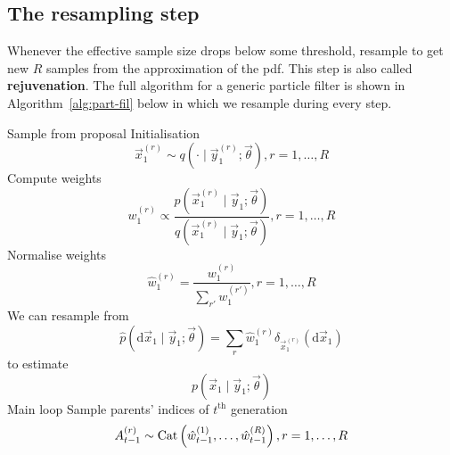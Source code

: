 \subsection{The resampling step}
    Whenever the effective sample size drops below some threshold, resample to get new $R$ samples from the approximation of the pdf. This step is also called \textbf{rejuvenation}. The full algorithm for a generic particle filter is shown in Algorithm~\ref{alg:part-fil} below in which we resample during every step.
    \begin{algorithmbis}\label{alg:part-fil}
        \begin{algorithmic}[1]
            \State Sample from proposal \Comment Initialisation
                \begin{equation}
                    \vec x_1^{(r)} \sim q\left(\cdot \mid \vec y_1^{(r)}; \vec \theta\right), r = 1, \dotsc, R
                \end{equation}
            \State Compute weights
                \begin{equation}
                    w_1^{(r)} \propto \frac{p\left(\vec x_1^{(r)} \mid \vec y_1; \vec \theta\right)}{q\left(\vec x_1^{(r)} \mid \vec y_1; \vec \theta \right)}, r = 1, \dotsc, R
                \end{equation}
            \State Normalise weights
                \begin{equation}
                    \hat w_1^{(r)} = \frac{w_1^{(r)}}{\sum_{r'} w_1^{(r')}}, r = 1, \dotsc, R
                \end{equation}
            \State We can resample from 
                \begin{equation}
                    \hat p(\mathrm d \vec x_1 \mid \vec y_1; \vec \theta) = \sum_r \hat w_1^{(r)} \delta_{\vec x_1^{(r)}}(\mathrm d\vec x_1)
                \end{equation}
                to estimate
                \begin{equation}
                    p(\vec x_1 \mid \vec y_1; \vec \theta)
                \end{equation}
             \Comment Main loop
                \State Sample parents' indices of $t^{\text{th}}$ generation
                    \begin{equation}
                        A_{t - 1}^{(r)} \sim \operatorname{Cat}\left(\hat w_{t - 1}^{(1)}, \dotsc, \hat w_{t - 1}^{(R)}\right), r = 1, \dotsc, R
                    \end{equation}

\end{algorithmic}
\end{algorithmbis}
